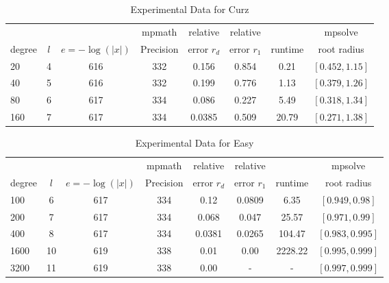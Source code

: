 \documentclass[sigconf]{acmart}
\begin{document}
\begin{table}[t]
\caption{Experimental Data for Curz}
\label{tab:curz}
\vskip -0.15in
\begin{center}
\begin{small}
\begin{sc}
\begin{tabular}{lccccccc}
\toprule
             &       &                       & mpmath   & relative       & relative       &               & mpsolve \\
degree  & $l$ & $e=-\log(|x|)$ & Precision & error $r_d$ & error $r_1$ & runtime & root radius\\
\midrule
 20 & 4 & 616 & 332 & 0.156 & 0.854 & 0.21 & $[0.452, 1.15]$\\
 40 & 5 & 616 & 332 & 0.199 & 0.776 & 1.13 & $[0.379, 1.26]$\\
 80 & 6 & 617 & 334 & 0.086 & 0.227 & 5.49 & $[0.318, 1.34]$\\
 160 & 7 & 617 & 334 & 0.0385 & 0.509 & 20.79 & $[0.271, 1.38]$\\
\bottomrule
\end{tabular}
\end{sc}
\end{small}
\end{center}
\vskip 0.05in
\end{table}


\begin{table}[t]
\caption{Experimental Data for Easy}
\label{tab:easy}
\vskip -0.15in
\begin{center}
\begin{small}
\begin{sc}
\begin{tabular}{lccccccc}
\toprule
&  &  & mpmath & relative  & relative &  & mpsolve \\
degree  & $l$& $e=-\log(|x|)$& Precision &error $r_d$       & error $r_1$ &runtime& root radius\\
\midrule
 100 & 6 & 617 & 334 & 0.12 & 0.0809 & 6.35 & $[0.949, 0.98]$\\
 200 & 7 & 617 & 334 & 0.068 & 0.047 & 25.57 & $[0.971, 0.99]$\\
 400 & 8 & 617 & 334 & 0.0381 & 0.0265 & 104.47 & $[0.983, 0.995]$\\
 1600 &10& 619 & 338 & 0.01 & 0.00 & 2228.22 & $[0.995, 0.999]$\\ %
  3200 &11& 619 & 338 & 0.00 & - & - & $[0.997, 0.999]$\\ %
\bottomrule
\end{tabular}
\end{sc}
\end{small}
\end{center}
\vskip 0.05in
\end{table}
\end{document}
